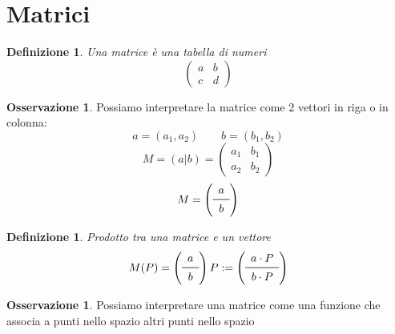 \documentclass[10pt,a4paper]{article}
\theoremstyle{plain}
\newtheorem{definizione}[subsection]{Definizione}
\theoremstyle{definition}
\newtheorem{osservazione}[subsection]{Osservazione}
\begin{document}
	\section{Matrici}
	\begin{definizione}
		Una matrice è una tabella di numeri
		\[\begin{pmatrix}
			a & b \\
			c & d
		\end{pmatrix}\]
	\end{definizione}
	\begin{osservazione}
		Possiamo interpretare la matrice come 2 vettori in riga o in colonna:
		\[
		a=(a_1,a_2) \qquad b=(b_1,b_2)
		\]
		\[
		M=(a\vert b)=
		\begin{pmatrix}
		a_1 & b_1 \\
		a_2 & b_2
		\end{pmatrix}
		\]
		\[
		M=
		\left(
		\begin{array}{cc}
		a\\ \midrule
		b
		\end{array}
		\right)
		\]
	\end{osservazione}
	\begin{definizione}
		Prodotto tra una matrice e un vettore
		\[
		M(P)= \left(
		\begin{array}{cc}
		a\\ \midrule
		b
		\end{array}
		\right)
		P
		:=
		\left(
		\begin{array}{cc}
		a \cdot P\\ \midrule
		b \cdot P
		\end{array}
		\right)
		\]
	\end{definizione}
	\begin{osservazione}
		Possiamo interpretare una matrice come una funzione che associa a punti nello spazio altri punti nello spazio
	\end{osservazione}
\end{document}
